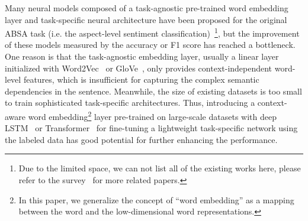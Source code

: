 \documentclass[11pt,a4paper]{article}
\begin{document}
Many neural models composed of a task-agnostic pre-trained word embedding layer and task-specific neural architecture have been proposed for the original ABSA task (i.e. the aspect-level sentiment classification)~\cite{tang-etal-2016-aspect,wang-etal-2016-attention,chen-etal-2017-recurrent-attention,liu-zhang-2017-attention,ma2017interactive,ma2018targeted,majumder-etal-2018-iarm,li-etal-2018-transformation,he-etal-2018-exploiting,xue-li-2018-aspect,wang-etal-2018-target,fan-etal-2018-multi,huang-carley-2018-parameterized,lei2019human,li2019exploiting,zhang2019aspect}\footnote{Due to the limited space, we can not list all of the existing works here, please refer to the survey~\cite{zhou2019deep} for more related papers.}, but the improvement of these models measured by the accuracy or F1 score has reached a bottleneck. One reason is that the task-agnostic embedding layer, usually a linear layer initialized with Word2Vec~\cite{mikolov2013distributed} or GloVe~\cite{pennington-etal-2014-glove}, only provides context-independent word-level features, which is insufficient for capturing the complex semantic dependencies in the sentence. Meanwhile, the size of existing datasets is too small to train sophisticated task-specific architectures. Thus, introducing a context-aware word embedding\footnote{In this paper, we generalize the concept of ``word embedding'' as a mapping between the word and the low-dimensional word representations.} layer pre-trained on large-scale datasets with deep LSTM~\cite{mccann2017learned,peters-etal-2018-deep,howard-ruder-2018-universal} or Transformer~\cite{radford2018improving,radford2019language,devlin-etal-2019-bert,lample2019cross,yang2019xlnet,dong2019unified} for fine-tuning a lightweight task-specific network using the labeled data has good potential for further enhancing the performance. 

\begin{table}[]
    \centering
    \caption{Different problem settings in ABSA. Gold standard aspects and opinions are wrapped in \texttt{\textbf{[]}} and \texttt{\textbf{<>}} respectively. The subscripts N and P refer to aspect sentiment. Underline \uwave{*} or \ul{*} indicates the association between the aspect and the opinion.}
    \label{tab:problem_settings}
\end{table}
\end{document}
